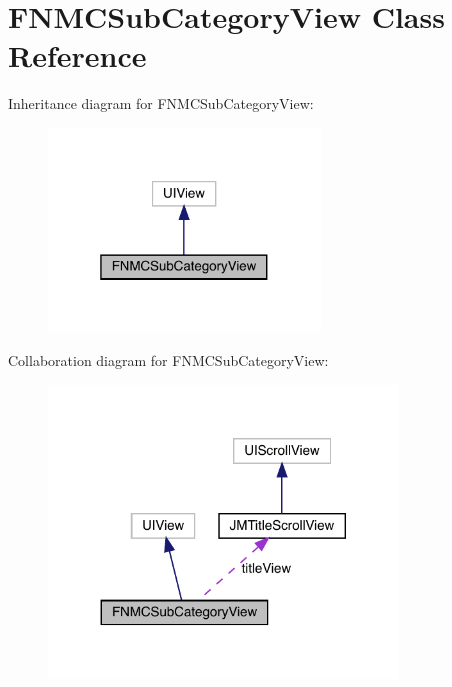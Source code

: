 \hypertarget{interface_f_n_m_c_sub_category_view}{}\section{F\+N\+M\+C\+Sub\+Category\+View Class Reference}
\label{interface_f_n_m_c_sub_category_view}


Inheritance diagram for F\+N\+M\+C\+Sub\+Category\+View\+:\nopagebreak
\begin{figure}[H]
\begin{center}
\leavevmode
\includegraphics[width=205pt]{interface_f_n_m_c_sub_category_view__inherit__graph}
\end{center}
\end{figure}


Collaboration diagram for F\+N\+M\+C\+Sub\+Category\+View\+:\nopagebreak
\begin{figure}[H]
\begin{center}
\leavevmode
\includegraphics[width=263pt]{interface_f_n_m_c_sub_category_view__coll__graph}
\end{center}
\end{figure}
